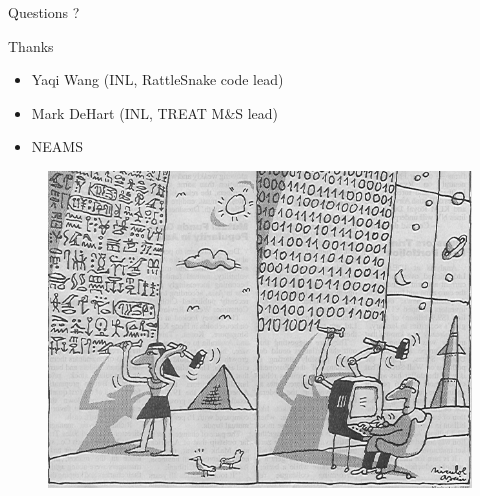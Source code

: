 \documentclass[8pt]{beamer}
\begin{document}
\begin{frame}{Questions ?}


\begin{block}{Thanks}
\begin{itemize}
\item Yaqi Wang (INL, RattleSnake code lead)
\item Mark DeHart (INL, TREAT M\&S lead)
\item NEAMS
\end{itemize}

\begin{block}{}
\begin{figure}
	\centering
	\includegraphics[scale=0.3]{./crunching.png}
\end{figure}
\end{block}

\end{block}

\end{frame}


%
%
%

%
%

\end{document}
